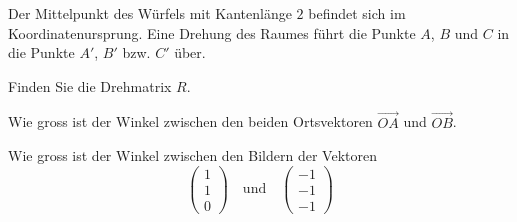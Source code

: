 Der Mittelpunkt des Würfels mit Kantenlänge $2$ befindet sich im
Koordinatenursprung.
Eine Drehung des Raumes führt die Punkte $A$, $B$ und $C$ in
die Punkte $A'$, $B'$ bzw. $C'$ über.

\begin{center}
\end{center}

\begin{teilaufgaben}
\item Finden Sie die Drehmatrix $R$.
\item Wie gross ist der Winkel zwischen den beiden Ortsvektoren $\overrightarrow{OA}$ und $\overrightarrow{OB}$.
\item Wie gross ist der Winkel zwischen den Bildern der Vektoren
\[
  \begin{pmatrix}1\\1\\0\end{pmatrix}\quad\text{und}\quad
  \begin{pmatrix}-1\\-1\\-1\end{pmatrix}
\]
\end{teilaufgaben}


